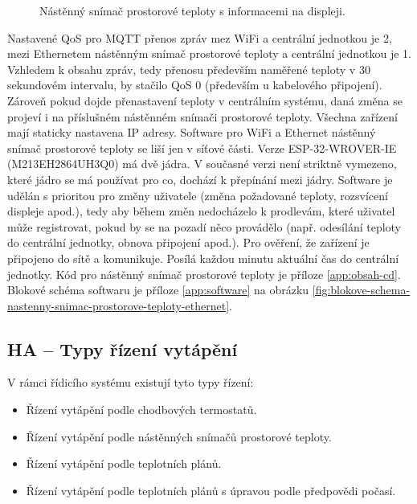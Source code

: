 \begin{figure}[H]
\caption{Nástěnný snímač prostorové teploty s informacemi na displeji.}
\label{fig:software-nastenny-snimac-prostorove-teploty-zapnuty-displej}
\end{figure}

Nastavené QoS pro MQTT přenos zpráv mez WiFi a centrální jednotkou je 2, mezi Ethernetem nástěnným snímač prostorové teploty a centrální jednotkou je 1. Vzhledem k obsahu zpráv, tedy přenosu především naměřené teploty v 30 sekundovém intervalu, by stačilo QoS 0 (především u kabelového připojení). Zároveň pokud dojde přenastavení teploty v centrálním systému, daná změna se projeví i na příslušném nástěnném snímači prostorové teploty. Všechna zařízení mají staticky nastavena IP adresy. Software pro WiFi a Ethernet nástěnný snímač prostorové teploty se liší jen v síťové části. Verze ESP-32-WROVER-IE (M213EH2864UH3Q0) má dvě jádra. V současné verzi není striktně vymezeno, které jádro se má používat pro co, dochází k přepínání mezi jádry. Software je udělán s prioritou pro změny uživatele (změna požadované teploty, rozsvícení displeje apod.), tedy aby během změn nedocházelo k prodlevám, které uživatel může registrovat, pokud by se na pozadí něco provádělo (např. odesílání teploty do centrální jednotky, obnova připojení apod.). Pro ověření, že zařízení je připojeno do sítě a komunikuje. Posílá každou minutu aktuální čas do centrální jednotky. Kód pro nástěnný snímač prostorové teploty je příloze \ref{app:obsah-cd}. Blokové schéma softwaru je příloze \ref{app:software} na obrázku \ref{fig:blokove-schema-nastenny-snimac-prostorove-teploty-ethernet}.


\newpage

\subsection{HA – Typy řízení vytápění}

\label{sec:typy-rizeni-vytapeni}
V rámci řídicího systému existují tyto typy řízení:

\begin{itemize}
  \item Řízení vytápění podle chodbových termostatů.
  \item Řízení vytápění podle nástěnných snímačů prostorové teploty.
  \item Řízení vytápění podle teplotních plánů.
  \item Řízení vytápění podle teplotních plánů s úpravou podle předpovědi počasí.
\end{itemize}

